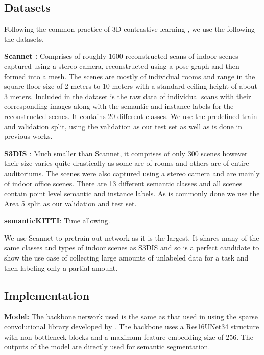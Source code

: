 \documentclass[10pt,twocolumn,letterpaper]{article}
\begin{document}
\subsection{Datasets}
\label{sec:results:datasets}

Following the common practice of 3D contrastive learning \cite{xie2020pointcontrast,hou2021Exploring, zhang2021Self, jiang2021Guided}, we use the following the datasets.

\textbf{Scannet \cite{Dai2017ScanNet}:} Comprises of roughly 1600 reconstructed scans of indoor scenes captured using a stereo camera, reconstructed using a pose graph and then formed into a mesh. The scenes are mostly of individual rooms and range in the square floor size of 2 meters to 10 meters with a standard ceiling height of about 3 meters. Included in the dataset is the raw data of individual scans with their corresponding images along with the semantic and instance labels for the reconstructed scenes. It contains 20 different classes. We use the predefined train and validation split, using the validation as our test set as well as is done in previous works.

\textbf{S3DIS \cite{armeni20163D}}: Much smaller than Scannet, it comprises of only 300 scenes however their size varies quite drastically as some are of rooms and others are of entire auditoriums. The scenes were also captured using a stereo camera and are mainly of indoor office scenes. There are 13 different semantic classes and all scenes contain point level semantic and instance labels. As is commonly done \cite{xie2020pointcontrast, hou2021Exploring} we use the Area 5 split as our validation and test set.

\textbf{semanticKITTI}: Time allowing.

We use Scannet to pretrain out network as it is the largest. It shares many of the same classes and types of indoor scenes as S3DIS and so is a perfect candidate to show the use case of collecting large amounts of unlabeled data for a task and then labeling only a partial amount.

\subsection{Implementation}
\label{sec:results:implementation}

\textbf{Model:} The backbone network used is the same as that used in \cite{xie2020pointcontrast, hou2021Exploring} using the sparse convolutional library developed by \cite{choy20194d}. The backbone uses a Res16UNet34 structure with non-bottleneck blocks and a maximum feature embedding size of 256. The outputs of the model are directly used for semantic segmentation.
\end{document}

